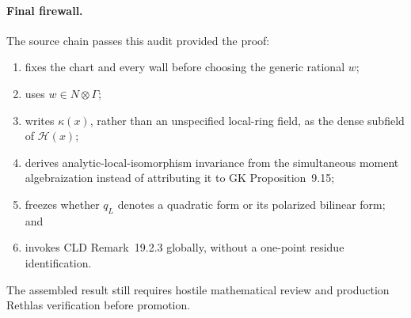 \paragraph{Final firewall.}
The source chain passes this audit provided the proof:
\begin{enumerate}
\item fixes the chart and every wall before choosing the generic rational
 \(w\);
\item uses \(w\in N\otimes\Gamma\);
\item writes \(\kappa(x)\), rather than an unspecified local-ring field, as
 the dense subfield of \(\mathscr H(x)\);
\item derives analytic-local-isomorphism invariance from the simultaneous
 moment algebraization instead of attributing it to GK Proposition~9.15;
\item freezes whether \(q_L\) denotes a quadratic form or its polarized
 bilinear form; and
\item invokes CLD Remark~19.2.3 globally, without a one-point residue
 identification.
\end{enumerate}
The assembled result still requires hostile mathematical review and
production Rethlas verification before promotion.
